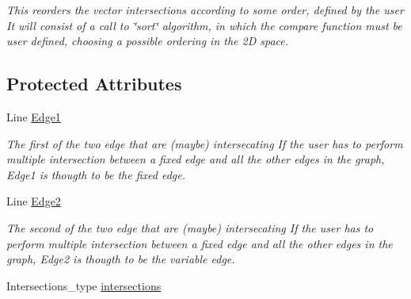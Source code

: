 \begin{DoxyCompactItemize}
\begin{DoxyCompactList}\small\item\em This reorders the vector intersections according to some order, defined by the user  It will consist of a call to \char`\"{}sort\char`\"{} algorithm, in which the compare function must be user defined, choosing a possible ordering in the 2D space. \item\end{DoxyCompactList}\end{DoxyCompactItemize}
\subsection*{Protected Attributes}
\begin{DoxyCompactItemize}
\item 
\hypertarget{classintersector__base__class_a9d52bda5a4eae76968f8cac57d055c41}{
Line \hyperlink{classintersector__base__class_a9d52bda5a4eae76968f8cac57d055c41}{Edge1}}
\label{classintersector__base__class_a9d52bda5a4eae76968f8cac57d055c41}

\begin{DoxyCompactList}\small\item\em The first of the two edge that are (maybe) intersecating  If the user has to perform multiple intersection between a fixed edge and all the other edges in the graph, Edge1 is thougth to be the fixed edge. \item\end{DoxyCompactList}\item 
\hypertarget{classintersector__base__class_af568953d08cce423eda95e4a7fbe1ecf}{
Line \hyperlink{classintersector__base__class_af568953d08cce423eda95e4a7fbe1ecf}{Edge2}}
\label{classintersector__base__class_af568953d08cce423eda95e4a7fbe1ecf}

\begin{DoxyCompactList}\small\item\em The second of the two edge that are (maybe) intersecating  If the user has to perform multiple intersection between a fixed edge and all the other edges in the graph, Edge2 is thougth to be the variable edge. \item\end{DoxyCompactList}\item 
\hypertarget{classintersector__base__class_a519ee3535c9e7aaf97a547413ebe0b08}{
Intersections\_\-type \hyperlink{classintersector__base__class_a519ee3535c9e7aaf97a547413ebe0b08}{intersections}}
\label{classintersector__base__class_a519ee3535c9e7aaf97a547413ebe0b08}


\end{DoxyCompactItemize}
